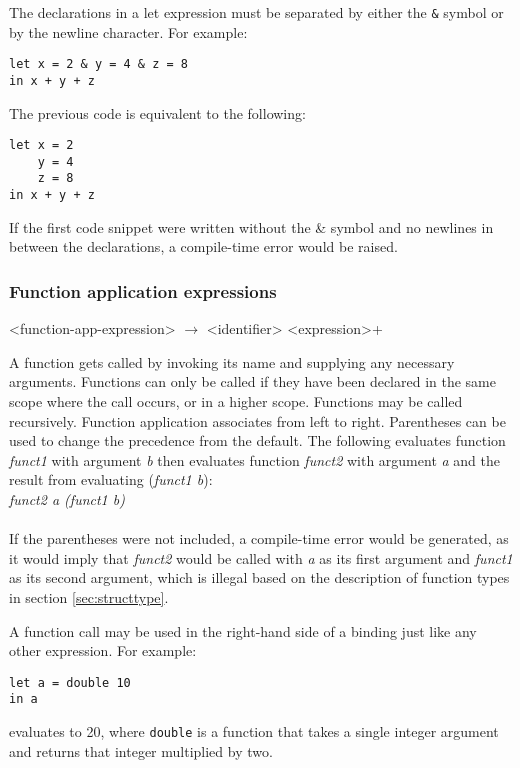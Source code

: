 The declarations in a let expression must be separated by either the \texttt{\&} symbol or by the newline character. For example:

\begin{verbatim}
let x = 2 & y = 4 & z = 8 
in x + y + z
\end{verbatim}

The previous code is equivalent to the following:

\begin{verbatim}
let x = 2
    y = 4
    z = 8
in x + y + z
\end{verbatim}

If the first code snippet were written without the \& symbol and no newlines in between the
declarations, a compile-time error would be raised.

\subsubsection{Function application expressions}

\begin{grammar}
<function-app-expression> $\rightarrow$ <identifier> <expression>+
\end{grammar}

A function gets called by invoking its name and supplying any necessary arguments. 
Functions can only be called if they have been declared in the same scope where the call occurs,
or in a higher scope. Functions may be called recursively. Function application associates 
from left to right. Parentheses can be used to change the precedence from the default.
The following evaluates function \emph{funct1} with argument \emph{b} then evaluates function
\emph{funct2} with argument \emph{a} and the result from evaluating (\emph{funct1 b}): \\
    
    \emph{funct2 a (funct1 b)}\\ \\
If the parentheses were not included, a compile-time error would be generated, as it would imply
that \emph{funct2} would be called with \emph{a} as
its first argument and \emph{funct1} as its second argument, which is illegal based on the description
of function types in section \ref{sec:structtype}.

A function call may be used in the right-hand side of a binding just like any other expression. 
For example:
\begin{verbatim}
let a = double 10 
in a
\end{verbatim}
evaluates to 20, where \texttt{double} is a function that takes a single integer argument and
returns that integer multiplied by two. 

